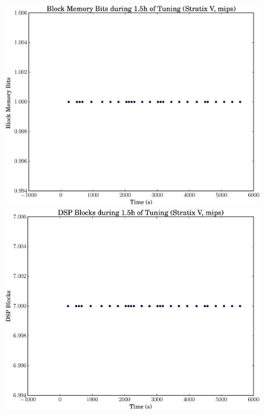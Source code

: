 \documentclass[12pt, a4paper]{article}
\begin{document}
\begin{figure}[htpb]
    \begin{minipage}{.48\textwidth}
        \includegraphics[scale=.25]{mips_block_5400_chstone_StratixV}
    \end{minipage}%
    \hfill
    \begin{minipage}{.48\textwidth}
        \includegraphics[scale=.25]{mips_dsp_5400_chstone_StratixV}
    \end{minipage}%


\end{figure}
\end{document}

